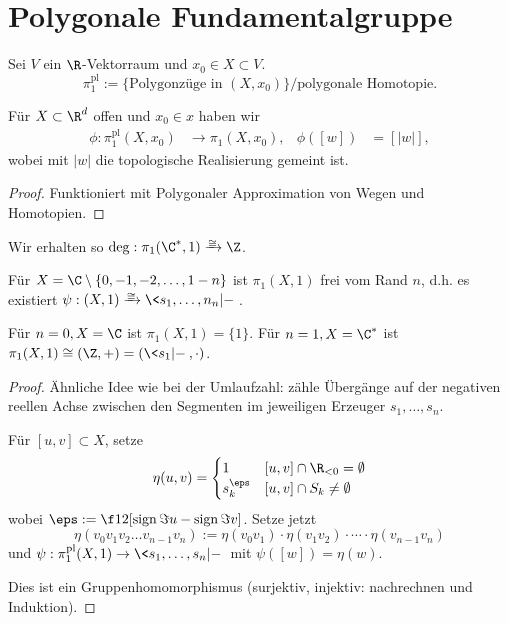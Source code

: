 \section{Polygonale Fundamentalgruppe}


\begin{df}
	Sei $V$ ein $\R$-Vektorraum und $x_0 \in X \subset V$.
	\[
		\pi_1^{\mathrm{pl}} := \{ \text{Polygonzüge in $(X, x_0)$} \} / \text{polygonale Homotopie}.
	\]
\end{df}

\begin{st}
	Für $X \subset \R^d$ offen und $x_0 \in x$ haben wir
	\begin{align*}
		\phi: \pi_1^{\mathrm{pl}}(X, x_0) &\to \pi_1(X, x_0), & \phi([w]) &= [|w|],
	\end{align*}
	wobei mit $|w|$ die topologische Realisierung gemeint ist.
	\begin{proof}
		Funktioniert mit Polygonaler Approximation von Wegen und Homotopien.
	\end{proof}
\end{st}

\begin{st}
	Wir erhalten so $\deg: \pi_1(\C^*, 1) \isomorphicto \Z$.
\end{st}

\begin{st}
	Für $X = \C \setminus \{0, -1, -2, \dotsc, 1 - n\}$ ist $\pi_1(X, 1)$ frei vom Rand $n$, d.h. es existiert $\psi: (X, 1) \isomorphicto \<s_1, \dotsc, n_n |  - \>$.
	\begin{note}
		Für $n = 0, X = \C$ ist $\pi_1(X, 1) = \{1\}$.
		Für $n = 1, X = \C^*$ ist $\pi_1(X, 1) \isomorphic (\Z, +) = (\<s_1| - \>, \cdot)$.
	\end{note}
	\begin{proof}
		Ähnliche Idee wie bei der Umlaufzahl: zähle Übergänge auf der negativen reellen Achse zwischen den Segmenten im jeweiligen Erzeuger $s_1, \dotsc, s_n$.

		Für $[u,v] \subset X$, setze
		\[
			\eta(u,v) = \begin{cases}
				1 & [u,v] \cap \R_{<0} = \emptyset \\
				s_k^\eps & [u,v] \cap S_k \neq \emptyset
			\end{cases}
		\]
		wobei $\eps := \f 12 [\sign \Im u - \sign \Im v]$.
		Setze jetzt
		\[
			\eta(v_0 v_1 v_2 \dotsc v_{n-1} v_n) := \eta(v_0 v_1) \cdot \eta(v_1 v_2) \cdot \dotsb \cdot \eta(v_{n-1} v_n)
		\]
		und $\psi: \pi_1^{\mathrm{pl}}(X, 1) \to \<s_1, \dotsc, s_n | - \>$ mit $\psi([w]) = \eta(w)$.

		Dies ist ein Gruppenhomomorphismus (surjektiv, injektiv: nachrechnen und Induktion).
	\end{proof}
\end{st}

